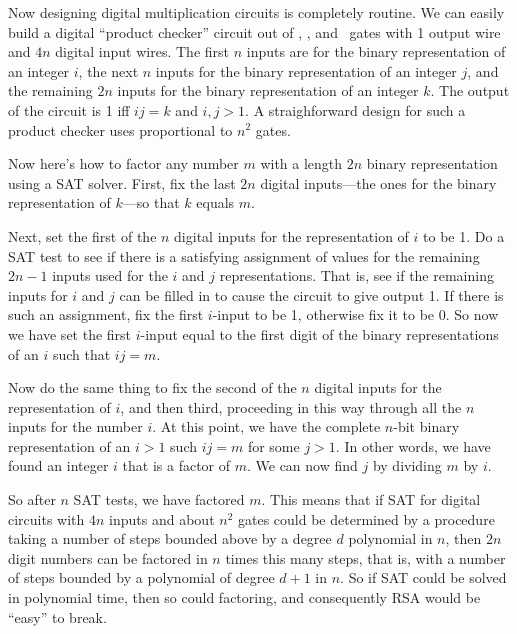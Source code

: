 Now designing digital multiplication circuits is completely routine.
We can easily build a digital ``product checker'' circuit out of
\QAND, \QOR, and \QNOT\ gates with 1 output wire and $4n$ digital
input wires.  The first $n$ inputs are for the binary representation
of an integer $i$, the next $n$ inputs for the binary representation
of an integer $j$, and the remaining $2n$ inputs for the binary
representation of an integer $k$.  The output of the circuit is 1 iff
$ij=k$ and $i,j>1$.  A straighforward design for such a product
checker uses proportional to $n^2$ gates.

Now here's how to factor any number $m$ with a length $2n$ binary
representation using a SAT solver.  First, fix the last $2n$ digital
inputs---the ones for the binary representation of $k$---so that $k$
equals $m$.

Next, set the first of the $n$ digital inputs for the representation
of $i$ to be 1.  Do a SAT test to see if there is a satisfying
assignment of values for the remaining $2n-1$ inputs used for the $i$
and $j$ representations.  That is, see if the remaining inputs for $i$
and $j$ can be filled in to cause the circuit to give output 1.  If
there is such an assignment, fix the first $i$-input to be 1,
otherwise fix it to be 0.  So now we have set the first $i$-input
equal to the first digit of the binary representations of an $i$ such
that $ij=m$.

Now do the same thing to fix the second of the $n$ digital inputs for
the representation of $i$, and then third, proceeding in this way
through all the $n$ inputs for the number $i$.  At this point, we have
the complete $n$-bit binary representation of an $i>1$ such $ij=m$ for
some $j>1$.  In other words, we have found an integer $i$ that is a
factor of $m$.  We can now find $j$ by dividing $m$ by $i$.

So after $n$ SAT tests, we have factored $m$.  This means that if SAT
for digital circuits with $4n$ inputs and about $n^2$ gates could be
determined by a procedure taking a number of steps bounded above by a
degree $d$ polynomial in $n$, then $2n$ digit numbers can be factored
in $n$ times this many steps, that is, with a number of steps bounded
by a polynomial of degree $d+1$ in $n$.  So if SAT could be solved
in polynomial time, then so could factoring, and consequently RSA
would be ``easy'' to break.

\begin{editingnotes}
\end{editingnotes}

